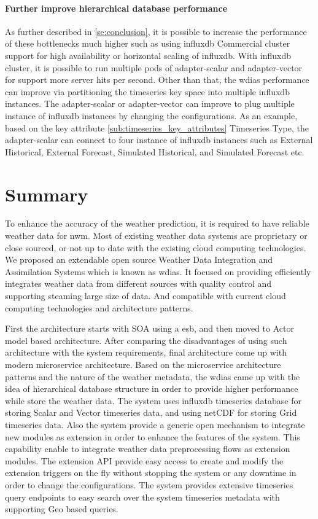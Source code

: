 \documentclass[conference]{IEEEtran}
\begin{document}
\paragraph{Further improve hierarchical database performance}
As further described in \ref{se:conclusion}, it is possible to increase the performance of these bottlenecks much higher such as using \acrshort{influxdb} Commercial cluster support for high availability or horizontal scaling of \acrshort{influxdb}. With \acrshort{influxdb} cluster, it is possible to run multiple pods of adapter-scalar and adapter-vector for support more server hits per second.
Other than that, the \acrshort{wdias} performance can improve via partitioning the timeseries key space into multiple \acrshort{influxdb} instances. The adapter-scalar or adapter-vector can improve to plug multiple instance of \acrshort{influxdb} instances by changing the configurations. As an example, based on the key attribute \ref{sub:timeseries_key_attributes} Timeseries Type, the adapter-scalar can connect to four instance of \acrshort{influxdb} instances such as  External Historical, External Forecast, Simulated Historical, and Simulated Forecast etc.

\section{Summary}
To enhance the accuracy of the weather prediction, it is required to have reliable weather data for \acrshort{nwm}. Most of existing weather data systems are proprietary or close sourced, or not up to date with the existing cloud computing technologies.
We proposed an extendable open source Weather Data Integration and Assimilation Systems which is known as \acrshort{wdias}. It focused on providing efficiently integrates weather data from different sources with quality control and supporting steaming large size of data. And compatible with current cloud computing technologies and architecture patterns.

First the architecture starts with SOA using a \acrfull{esb}, and then moved to Actor model based architecture. After comparing the disadvantages of using such architecture with the system requirements, final architecture come up with modern microservice architecture.
Based on the microservice architecture patterns and the nature of the weather metadata, the \acrshort{wdias} came up with the idea of hierarchical database structure in order to provide higher performance while store the weather data. The system uses \acrshort{influxdb} timeseries database for storing Scalar and Vector timeseries data, and using \acrshort{netCDF} for storing Grid timeseries data.
Also the system provide a generic open mechanism to integrate new modules as extension in order to enhance the features of the system. This capability enable to integrate weather data preprocessing flows as extension modules.
The extension API provide easy access to create and modify the extension triggers on the fly without stopping the system or any downtime in order to change the configurations.
The system provides extensive timeseries query endpoints to easy search over the system timeseries metadata with supporting Geo based queries.
\end{document}
